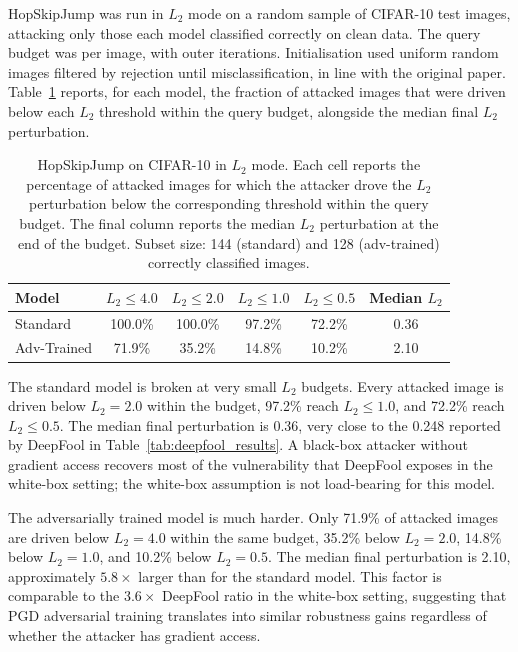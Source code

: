 HopSkipJump was run in $L_2$ mode on a random sample of \HSJN{} CIFAR-10 test images, attacking only those each model classified correctly on clean data. The query budget was \HSJQ{} per image, with \HSJI{} outer iterations. Initialisation used uniform random images filtered by rejection until misclassification, in line with the original paper. Table~\ref{tab:hsj_results} reports, for each model, the fraction of attacked images that were driven below each $L_2$ threshold within the query budget, alongside the median final $L_2$ perturbation.

\begin{table}[htbp]
    \centering
    \caption{HopSkipJump on CIFAR-10 in $L_2$ mode. Each cell reports the percentage of attacked images for which the attacker drove the $L_2$ perturbation below the corresponding threshold within the query budget. The final column reports the median $L_2$ perturbation at the end of the budget. Subset size: 144 (standard) and 128 (adv-trained) correctly classified images.}
    \label{tab:hsj_results}
    \begin{tabular}{lccccc}
        \toprule
        \textbf{Model} & $L_2 \le 4.0$ & $L_2 \le 2.0$ & $L_2 \le 1.0$ & $L_2 \le 0.5$ & \textbf{Median $L_2$} \\
        \midrule
        Standard & 100.0\% & 100.0\% & 97.2\% & 72.2\% & 0.36 \\
        Adv-Trained & 71.9\% & 35.2\% & 14.8\% & 10.2\% & 2.10 \\
        \bottomrule
    \end{tabular}
\end{table}

The standard model is broken at very small $L_2$ budgets. Every attacked image is driven below $L_2 = 2.0$ within the budget, 97.2\% reach $L_2 \le 1.0$, and 72.2\% reach $L_2 \le 0.5$. The median final perturbation is 0.36, very close to the 0.248 reported by DeepFool in Table~\ref{tab:deepfool_results}. A black-box attacker without gradient access recovers most of the vulnerability that DeepFool exposes in the white-box setting; the white-box assumption is not load-bearing for this model.

The adversarially trained model is much harder. Only 71.9\% of attacked images are driven below $L_2 = 4.0$ within the same budget, 35.2\% below $L_2 = 2.0$, 14.8\% below $L_2 = 1.0$, and 10.2\% below $L_2 = 0.5$. The median final perturbation is 2.10, approximately $5.8\times$ larger than for the standard model. This factor is comparable to the $3.6\times$ DeepFool ratio in the white-box setting, suggesting that PGD adversarial training translates into similar robustness gains regardless of whether the attacker has gradient access.

